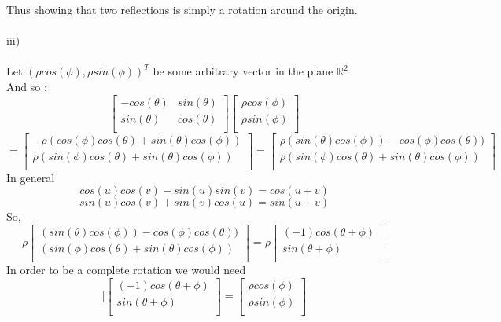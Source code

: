 \documentclass[letterpaper,12pt]{article}
\theoremstyle{definition}
\begin{document}
Thus showing that two reflections is simply a rotation around the origin.\\
\\
iii) \\ \\
Let $(\rho cos(\phi), \rho sin(\phi))^T$ be some arbitrary vector in the plane $\mathbb{R}^2$\\
And so :
\[
 \begin{bmatrix}
  -cos(\theta) & sin(\theta) \\
    sin(\theta) & cos(\theta) \\
 \end{bmatrix}
 \begin{bmatrix}
    \rho cos(\phi) \\
    \rho sin(\phi) \\
 \end{bmatrix} 
\]
 \[= 
  \begin{bmatrix}
    -\rho (cos(\phi)cos(\theta) + sin(\theta)cos(\phi))  \\
    \rho (sin(\phi)cos(\theta) + sin(\theta)cos(\phi)) \\
 \end{bmatrix} = 
 \begin{bmatrix}
    \rho (sin(\theta)cos(\phi)) - cos(\phi)cos(\theta) )   \\
    \rho (sin(\phi)cos(\theta) + sin(\theta)cos(\phi)) \\
 \end{bmatrix}
 \]
 In general\\
 \[cos(u)cos(v) - sin(u)sin(v) = cos(u+v)\]
 \[sin(u)cos(v) + sin(v)cos(u) = sin(u+v)\]
 So,
 \[\rho
 \begin{bmatrix}
    (sin(\theta)cos(\phi)) - cos(\phi)cos(\theta) )   \\
    (sin(\phi)cos(\theta) + sin(\theta)cos(\phi)) \\
 \end{bmatrix} = \rho
 \begin{bmatrix}
    (-1)cos(\theta + \phi)   \\
    sin(\theta + \phi) \\
 \end{bmatrix}
 \]
 In order to be a complete rotation we would need 
 \[]
 \begin{bmatrix}
    (-1)cos(\theta + \phi)   \\
    sin(\theta + \phi) \\
 \end{bmatrix} = 
 \begin{bmatrix}
    \rho cos(\phi) \\
    \rho sin(\phi) \\
 \end{bmatrix}
 \]
\end{document}
